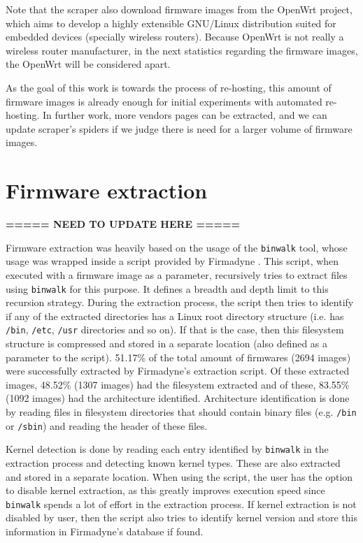 Note that the scraper also download firmware images from the OpenWrt project, which aims to develop a highly extensible GNU/Linux distribution suited for embedded devices (specially wireless routers). Because OpenWrt is not really a wireless router manufacturer, in the next statistics regarding the firmware images, the OpenWrt will be considered apart.

As the goal of this work is towards the process of re-hosting, this amount of firmware images is already enough for initial experiments with automated re-hosting. In further work, more vendors pages can be extracted, and we can update scraper's spiders if we judge there is need for a larger volume of firmware images.

\section{Firmware extraction}

\textbf{===== NEED TO UPDATE HERE =====}

Firmware extraction was heavily based on the usage of the {\tt binwalk} tool, whose usage was wrapped inside a script provided by Firmadyne \cite{firmadyne}. This script, when executed with a firmware image as a parameter, recursively tries to extract files using {\tt binwalk} for this purpose. It defines a breadth and depth limit to this recursion strategy. During the extraction process, the script then tries to identify if any of the extracted directories has a Linux root directory structure (i.e. has {\tt /bin}, {\tt /etc}, {\tt /usr} directories and so on). If that is the case, then this filesystem structure is compressed and stored in a separate location (also defined as a parameter to the script). 51.17\% of the total amount of firmwares (2694 images) were successfully extracted by Firmadyne's \cite{firmadyne} extraction script. Of these extracted images, 48.52\% (1307 images) had the filesystem extracted and of these, 83.55\% (1092 images) had the architecture identified. Architecture identification is done by reading files in filesystem directories that should contain binary files (e.g. {\tt /bin} or {\tt /sbin}) and reading the header of these files.

Kernel detection is done by reading each entry identified by {\tt binwalk} in the extraction process and detecting known kernel types. These are also extracted and stored in a separate location. When using the script, the user has the option to disable kernel extraction, as this greatly improves execution speed since {\tt binwalk} spends a lot of effort in the extraction process. If kernel extraction is not disabled by user, then the script also tries to identify kernel version and store this information in Firmadyne's \cite{firmadyne} database if found.


